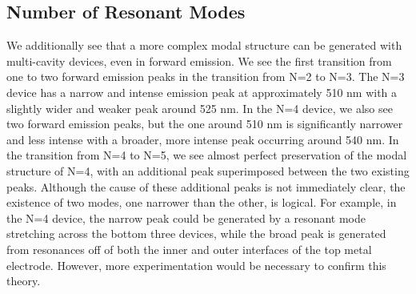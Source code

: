 \documentclass{report}
\begin{document}
        \subsection{Number of Resonant Modes} \label{numModes}
        We additionally see that a more complex modal structure can be generated with multi-cavity devices, even in forward emission. We see the first transition from one to two forward emission peaks in the transition from N=2 to N=3. The N=3 device has a narrow and intense emission peak at approximately 510 nm with a slightly wider and weaker peak around 525 nm. In the N=4 device, we also see two forward emission peaks, but the one around 510 nm is significantly narrower and less intense with a broader, more intense peak occurring around 540 nm. In the transition from N=4 to N=5, we see almost perfect preservation of the modal structure of N=4, with an additional peak superimposed between the two existing peaks. Although the cause of these additional peaks is not immediately clear, the existence of two modes, one narrower than the other, is logical. For example, in the N=4 device, the narrow peak could be generated by a resonant mode stretching across the bottom three devices, while the broad peak is generated from resonances off of both the inner and outer interfaces of the top metal electrode. However, more experimentation would be necessary to confirm this theory.
\end{document}
